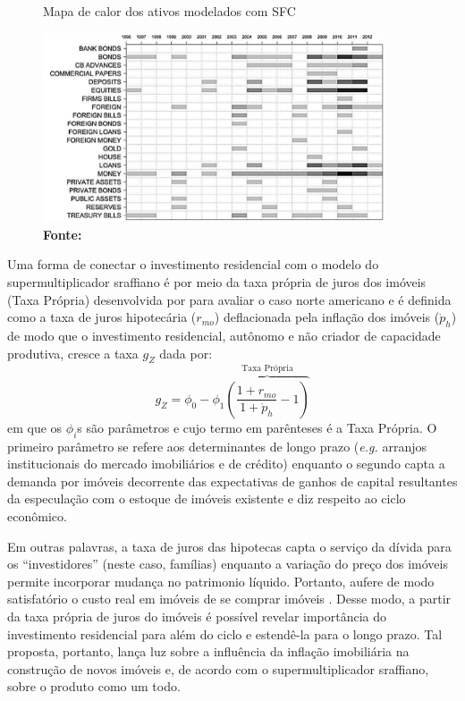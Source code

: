 \begin{figure}
	\centering
	\caption{Mapa de calor dos ativos modelados com SFC}
	\label{Heatmap}
	\includegraphics[width = 0.9\textwidth]{../../Escrita_Dissertacao/Da_Silveira_Dissertacao_Atual/Modelo/Caverzassi_Heatmap.png}
	\caption*{\textbf{Fonte:} \textcite[p.~4]{caverzasi_stock-flow_2013}}
\end{figure}


Uma forma de conectar o investimento residencial com o modelo do supermultiplicador sraffiano é por meio da taxa própria de juros dos imóveis (Taxa Própria) desenvolvida por \textcite{teixeira_crescimento_2015} para avaliar o caso norte americano e é definida como a taxa de juros hipotecária ($r_{mo}$) deflacionada pela inflação dos imóveis ({$\dot p_h$}) de modo que o investimento residencial, autônomo e não criador de capacidade produtiva, cresce a taxa $g_Z$ dada por:
\begin{equation}
g_Z = \phi_0 - \phi_1 \overbrace{\left(\frac{1+r_{mo}}{1+\dot p_h} - 1\right)}^{\text{Taxa Própria}}
\end{equation}
em que os $\phi_i$s são parâmetros e cujo termo em parênteses é a Taxa Própria. O primeiro parâmetro se refere aos determinantes de longo prazo (\textit{e.g.} arranjos institucionais do mercado imobiliários e de crédito) enquanto o segundo capta a demanda por imóveis decorrente das expectativas de ganhos de capital resultantes da especulação com o estoque de imóveis existente e diz respeito ao ciclo econômico.

Em outras palavras, a taxa de juros das hipotecas capta o serviço da dívida para os ``investidores'' (neste caso, famílias) enquanto a variação do preço dos imóveis permite incorporar mudança no patrimonio líquido. Portanto, aufere de modo satisfatório o custo real em imóveis de se comprar imóveis \cite[p.~53]{teixeira_crescimento_2015}. Desse modo, a partir da taxa própria de juros do imóveis é possível revelar importância do investimento residencial para além do ciclo e estendê-la para o longo prazo.  Tal proposta, portanto, lança luz sobre a influência da inflação imobiliária na construção de novos imóveis e, de acordo com o supermultiplicador sraffiano, sobre o produto como um todo. 

